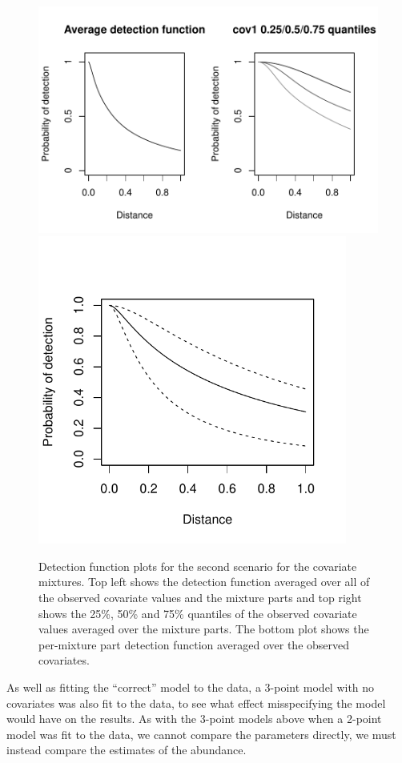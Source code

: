 \begin{figure}
\centering
\includegraphics[width=6in]{mix/figs/covsim2-detfct.pdf}
\includegraphics[width=4in]{mix/figs/covsim2-detfct-comp.pdf}
\caption{Detection function plots for the second scenario for the covariate mixtures. Top left shows the detection function averaged over all of the observed covariate values and the mixture parts and top right shows the 25\%, 50\% and 75\% quantiles of the observed covariate values averaged over the mixture parts. The bottom plot shows the per-mixture part detection function averaged over the observed covariates.}
\label{mmds-cov2-detfct}
\end{figure}

As well as fitting the ``correct'' model to the data, a 3-point model with no covariates was also fit to the data, to see what effect misspecifying the model would have on the results. As with the 3-point models above when a 2-point model was fit to the data, we cannot compare the parameters directly, we must instead compare the estimates of the abundance.

